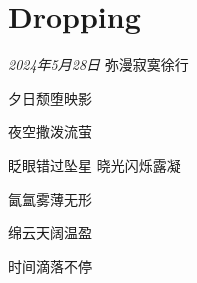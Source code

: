 \section*{Dropping}
\begin{center}
\textit{2024年5月28日}\hh 
弥漫寂寞\quad 徐行

夕日颓堕\quad 映影

夜空撒泼\quad 流萤

眨眼错过\quad 坠星\hh
晓光闪烁\quad 露凝

氤氲雾薄\quad 无形

绵云天阔\quad 温盈

时间滴落\quad 不停
\end{center}